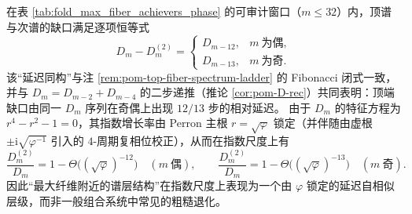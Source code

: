 \begin{remark}\label{rem:pom-max-fiber-gap-delay-12-13}
在表 \ref{tab:fold_max_fiber_achievers_phase} 的可审计窗口（\(m\le 32\)）内，顶谱与次谱的缺口满足逐项恒等式
\[
D_m-D_m^{(2)}=
\begin{cases}
D_{m-12}, & m\ \text{为偶},\\
D_{m-13}, & m\ \text{为奇}.
\end{cases}
\]
该“延迟同构”与注 \ref{rem:pom-top-fiber-spectrum-ladder} 的 Fibonacci 闭式一致，并与 \(D_m=D_{m-2}+D_{m-4}\) 的二步递推（推论 \ref{cor:pom-D-rec}）共同表明：顶端缺口由同一 \(D_m\) 序列在奇偶上出现 \(12/13\) 步的相对延迟。
由于 \(D_m\) 的特征方程为 \(r^4-r^2-1=0\)，其指数增长率由 Perron 主根 \(r=\sqrt\varphi\) 锁定（并伴随由虚根 \(\pm\mathrm{i}\sqrt{\varphi^{-1}}\) 引入的 \(4\)-周期复相位校正），从而在指数尺度上有
\[
\frac{D_m^{(2)}}{D_m}
=1-\Theta\!\bigl((\sqrt\varphi)^{-12}\bigr)\quad(m\ \text{偶}),
\qquad
\frac{D_m^{(2)}}{D_m}
=1-\Theta\!\bigl((\sqrt\varphi)^{-13}\bigr)\quad(m\ \text{奇}).
\]
因此“最大纤维附近的谱层结构”在指数尺度上表现为一个由 \(\varphi\) 锁定的延迟自相似层级，而非一般组合系统中常见的粗糙退化。
\end{remark}

